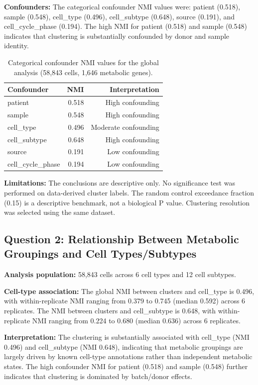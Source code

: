 \documentclass[11pt]{article}
\begin{document}
\textbf{Confounders:} The categorical confounder NMI values were: patient (0.518), sample (0.548), cell_type (0.496), cell_subtype (0.648), source (0.191), and cell_cycle_phase (0.194). The high NMI for patient (0.518) and sample (0.548) indicates that clustering is substantially confounded by donor and sample identity.

\begin{table}[h!]
\centering
\caption{Categorical confounder NMI values for the global analysis (58,843 cells, 1,646 metabolic genes).}
\label{tab:confounders_global}
\begin{tabular}{lrr}
\toprule
Confounder & NMI & Interpretation \\
\midrule
patient & 0.518 & High confounding \\
sample & 0.548 & High confounding \\
cell_type & 0.496 & Moderate confounding \\
cell_subtype & 0.648 & High confounding \\
source & 0.191 & Low confounding \\
cell_cycle_phase & 0.194 & Low confounding \\
\bottomrule
\end{tabular}
\end{table}

\textbf{Limitations:} The conclusions are descriptive only. No significance test was performed on data-derived cluster labels. The random control exceedance fraction (0.15) is a descriptive benchmark, not a biological P value. Clustering resolution was selected using the same dataset.

\subsection{Question 2: Relationship Between Metabolic Groupings and Cell Types/Subtypes}

\textbf{Analysis population:} 58,843 cells across 6 cell types and 12 cell subtypes.

\textbf{Cell-type association:} The global NMI between clusters and cell_type is 0.496, with within-replicate NMI ranging from 0.379 to 0.745 (median 0.592) across 6 replicates. The NMI between clusters and cell_subtype is 0.648, with within-replicate NMI ranging from 0.224 to 0.680 (median 0.636) across 6 replicates.

\textbf{Interpretation:} The clustering is substantially associated with cell_type (NMI 0.496) and cell_subtype (NMI 0.648), indicating that metabolic groupings are largely driven by known cell-type annotations rather than independent metabolic states. The high confounder NMI for patient (0.518) and sample (0.548) further indicates that clustering is dominated by batch/donor effects.
\end{document}
